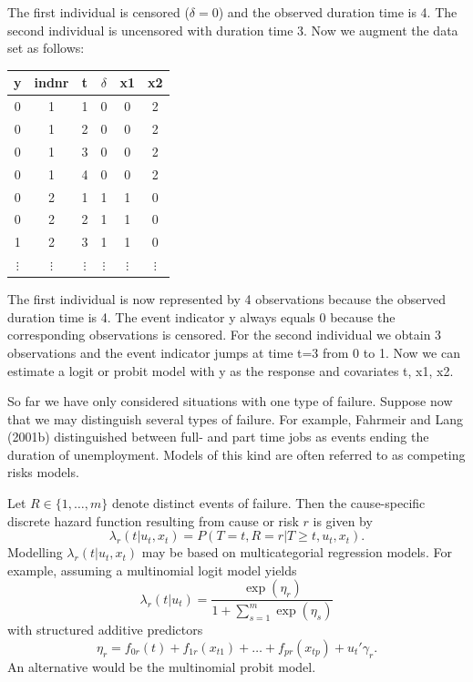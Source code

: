 \documentclass[11pt,a4paper,twoside]{bayesxarticle}
\begin{document}
The first individual is censored ($\delta=0$) and the observed
duration time is 4. The second individual is uncensored with
duration time 3. Now we augment the data set as follows:

\begin{center}
\begin{tabular}{c|c|c|c|c|c}
y & indnr & t &$\delta$ & x1 & x2\\\hline\hline
0 &  1 &   1 & 0  &    0  & 2\\
0 &  1 &   2 & 0  &    0  & 2\\
0 &  1 &   3&  0  &    0 &  2\\
0 &  1  &  4&  0  &    0 &  2\\\hline
0 &  2  &  1 & 1   &   1 &  0\\
0  & 2  &  2 & 1  &    1  & 0\\
1 &  2 &  3 & 1  &  1  & 0\\\hline
 $\vdots$ & $\vdots$ & $\vdots$ & $\vdots$& $\vdots$& $\vdots$
\end{tabular}
\end{center}

The first individual is now represented by 4 observations because
the observed duration time is 4. The event indicator y always equals
0 because the corresponding observations is censored. For the second
individual we obtain 3 observations and the event indicator jumps at
time t=3 from 0 to 1. Now we can estimate a logit or probit model
with y as the response and covariates t, x1, x2.

So far we have only considered situations with one type of failure.
Suppose now that we may distinguish several types of failure. For
example, Fahrmeir and Lang (2001b) distinguished between full- and
part time jobs as events ending the duration of unemployment. Models
of this kind are often referred to as competing risks models.

Let $R \in \{1,\dots,m\}$ denote distinct events of failure. Then
the cause-specific discrete hazard function resulting from cause or
risk $r$ is given by
$$
\lambda_{r}(t|u_t,x_t) = P(T=t,R=r|T \geq t, u_t,x_t).
$$
Modelling $\lambda_{r}(t|u_t,x_t)$ may be based on multicategorial
regression models. For example, assuming a multinomial logit model
yields
$$
\lambda_{r}(t|u_t) = \frac{\exp(\eta_{r})}{1+\sum_{s=1}^m
\exp(\eta_s)}
$$
with structured additive predictors
\begin{equation}
\label{gampred3} \eta_{r}=f_{0r}(t) +
f_{1r}(x_{t1})+\dots+f_{pr}(x_{tp})+u_{t}'\gamma_r.
\end{equation}
An alternative would be the multinomial probit model.
\end{document}
